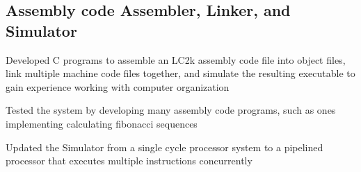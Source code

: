\documentclass[letter,10pt]{article}
\begin{document}
\subsection{{Assembly code Assembler, Linker, and Simulator }}
\begin{zitemize}
\item Developed C programs to assemble an LC2k assembly code file into object files, link multiple machine code files together, and simulate the resulting executable to gain experience working with computer organization
\item Tested the system by developing many assembly code programs, such as ones implementing calculating fibonacci sequences
\item Updated the Simulator from a single cycle processor system to a pipelined processor that executes multiple instructions concurrently
\end{zitemize}

\end{document}
